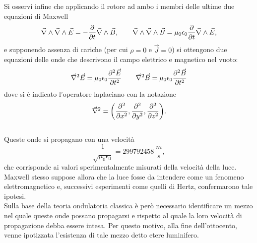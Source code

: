 Si osservi infine che applicando il rotore ad ambo 
i membri delle ultime due equazioni di Maxwell
\begin{equation*}
	\vec{\nabla}\wedge\vec{\nabla}\wedge\vec{E}=-\frac{\partial}{\partial t}\vec{\nabla}\wedge\vec{B},
	\qquad \vec{\nabla}\wedge\vec{\nabla}\wedge\vec{B}=\mu_0\epsilon_0\frac{\partial}{\partial t}
	\vec{\nabla}\wedge\vec{E},
\end{equation*}
e supponendo assenza di cariche (per cui $\rho=0$ e $\vec{J}=0$) si ottengono due equazioni delle onde che descrivono 
il campo elettrico e magnetico nel vuoto:
\begin{equation}
	\vec{\nabla}^2\vec{E}=\mu_0\epsilon_0\frac{\partial^2\vec{E}}{\partial t^2} \qquad \vec{\nabla}^2\vec{B}=
	\mu_0\epsilon_0\frac{\partial^2\vec{B}}{\partial t^2}
	\label{OndeEMVuoto}
\end{equation}
dove si è indicato l'operatore laplaciano con la notazione $$\vec{\nabla}^2=\bigg(\frac{\partial^2 }{\partial x^2},\frac{\partial^2 }{\partial y^2},\frac{\partial^2 }{\partial z^2}\bigg).$$\\
Queste onde si propagano con una velocità $$\frac{1}{\sqrt{\mu_0\epsilon_0}}=299792458\  \frac{m}{s},$$ 
che corrisponde ai valori sperimentalmente misurati della velocità della luce.\\ Maxwell stesso suppose allora che la luce fosse da intendere come un fenomeno elettromagnetico e, successivi esperimenti come quelli di Hertz, confermarono tale ipotesi.\\
Sulla base della teoria ondulatoria classica è però necessario identificare un mezzo nel quale queste onde possano 
propagarsi e rispetto al quale la loro velocità di propagazione debba essere intesa. Per questo motivo, alla fine dell'ottocento, venne ipotizzata l'esistenza di tale mezzo detto etere luminifero.